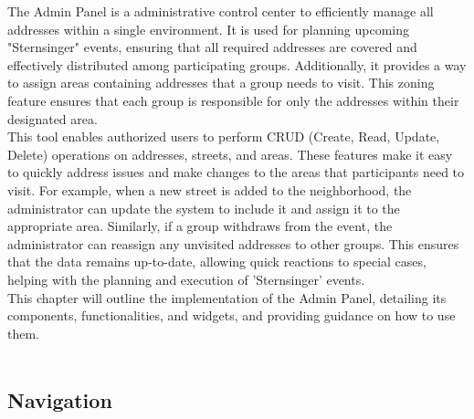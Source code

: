 \Author{\daAuthorOne}

The Admin Panel is a administrative control center to efficiently manage all addresses within a single environment. It is used for planning upcoming "Sternsinger" events, ensuring that all required addresses are covered and effectively distributed among participating groups. Additionally, it provides a way to assign areas containing addresses that a group needs to visit. This zoning feature ensures that each group is responsible for only the addresses within their designated area.\\

This tool enables authorized users to perform CRUD (Create, Read, Update, Delete) operations on addresses, streets, and areas. These features make it easy to quickly address issues and make changes to the areas that participants need to visit. For example, when a new street is added to the neighborhood, the administrator can update the system to include it and assign it to the appropriate area. Similarly, if a group withdraws from the event, the administrator can reassign any unvisited addresses to other groups. This ensures that the data remains up-to-date, allowing quick reactions to special cases, helping with the planning and execution of 'Sternsinger' events.\\

This chapter will outline the implementation of the Admin Panel, detailing its components, functionalities, and widgets, and providing guidance on how to use them.\\\\


\subsection{Navigation}

